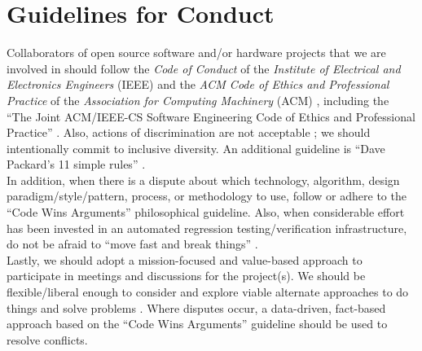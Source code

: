 \documentclass[letter,12pt]{article}
\begin{document}
\section{Guidelines for Conduct}
\label{sec:GuidelinesforConduct}

Collaborators of open source software and/or hardware projects that we are involved in should follow the {\it Code of Conduct} of the {\it Institute of Electrical and Electronics Engineers} (IEEE) \cite{IEEE2014b,IEEE2014a,IEEE2014} and the {\it ACM Code of Ethics and Professional Practice} of the {\it Association for Computing Machinery} (ACM) \cite{Gotterbarn2018b,Gotterbarn2018a,Gotterbarn2018,Brinkman2016a,ACMCouncil1992,Brinkman2017,Brinkman2016,Wolf2016,Anderson1993}, including the ``The Joint {ACM/IEEE-CS} Software Engineering Code of Ethics and Professional Practice'' \cite{Gotterbarn1999,Gotterbarn1997}. Also, actions of discrimination are not acceptable \cite{IEEE2014c}; we should intentionally commit to inclusive diversity. An additional guideline is ``Dave Packard's 11 simple rules'' \cite{HewlettPackardCompany2012}. \\


In addition, when there is a dispute about which technology, algorithm, design paradigm/style/pattern, process, or methodology to use, follow or adhere to the ``Code Wins Arguments'' \cite{Kushner2011,Zuckerberg2012} philosophical guideline. Also, when considerable effort has been invested in an automated regression testing/verification infrastructure, do not be afraid to ``move fast and break things'' \cite{Fong2011,Evangelista2012}. \\

Lastly, we should adopt a mission-focused and value-based approach to participate in meetings and discussions for the project(s). We should be flexible/liberal enough to consider and explore viable alternate approaches to do things and solve problems \cite{Beedle2001,Beedle2001a}. Where disputes occur, a data-driven, fact-based approach based on the ``Code Wins Arguments'' guideline should be used to resolve conflicts.
\end{document}
